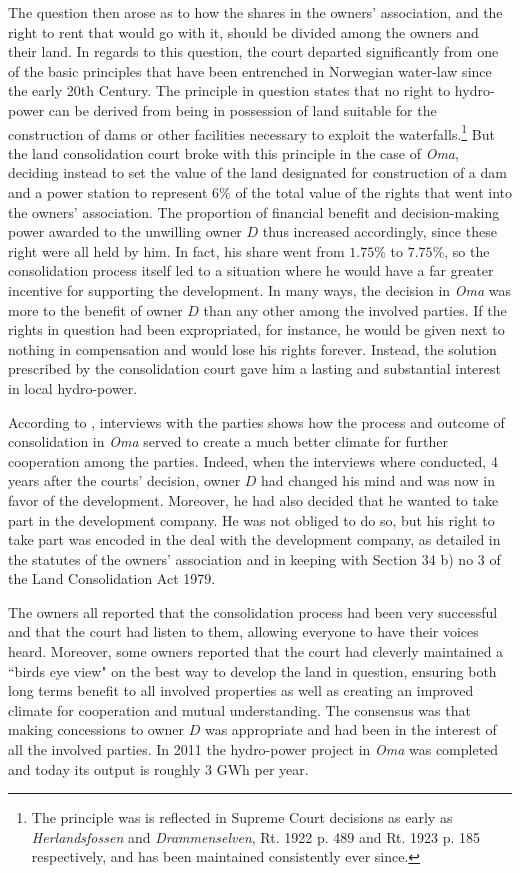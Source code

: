 The question then arose as to how the shares in the owners' association, and the right to rent that would go with it, should be divided among the owners and their land. In regards to this question, the court departed significantly from one of the basic principles that have been entrenched in Norwegian water-law since the early 20th Century. The principle in question states that no right to hydro-power can be derived from being in possession of land suitable for the construction of dams or other facilities necessary to exploit the waterfalls.\footnote{The principle was is reflected in Supreme Court decisions as early as \emph{Herlandsfossen} and \emph{Drammenselven}, Rt. 1922 p. 489 and Rt. 1923 p. 185 respectively, and has been maintained consistently ever since.} But the land consolidation court broke with this principle in the case of \emph{Oma}, deciding instead to set the value of the land designated for construction of a dam and a power station to represent $6 \%$ of the total value of the rights that went into the owners' association. The proportion of financial benefit and decision-making power awarded to the unwilling owner $D$ thus increased accordingly, since these right were all held by him. In fact, his share went from $1.75 \%$ to $7.75 \%$, so the consolidation process itself led to a situation where he would have a far greater incentive for supporting the development. In many ways, the decision in \emph{Oma} was more to the benefit of owner $D$ than any other among the involved parties. If the rights in question had been expropriated, for instance, he would be given next to nothing in compensation and would lose his rights forever. Instead, the solution prescribed by the consolidation court gave him a lasting and substantial interest in local hydro-power.

According to \cite{master}, interviews with the parties shows how the process and outcome of consolidation in \emph{Oma} served to create a much better climate for further cooperation among the parties. Indeed, when the interviews where conducted, 4 years after the courts' decision, owner $D$ had changed his mind and was now in favor of the development. Moreover, he had also decided that he wanted to take part in the development company. He was not obliged to do so, but his right to take part was encoded in the deal with the development company, as detailed in the statutes of the owners' association and in keeping with Section 34 b) no 3 of the Land Consolidation Act 1979.

The owners all reported that the consolidation process had been very successful and that the court had listen to them, allowing everyone to have their voices heard. Moreover, some owners reported that the court had cleverly maintained a ``birds eye view" on the best way to develop the land in question, ensuring both long terms benefit to all involved properties as well as creating an improved climate for cooperation and mutual understanding. The consensus was that making concessions to owner $D$ was appropriate and had been in the interest of all the involved parties. In 2011 the hydro-power project in \emph{Oma} was completed and today its output is roughly 3 GWh per year.

